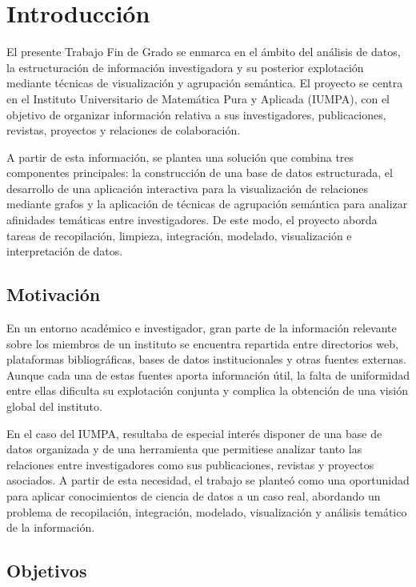 \documentclass[11pt,spanish,listoffigures,listoftables]{tfgetsinf}
\begin{document}

\chapter{Introducción} 

El presente Trabajo Fin de Grado se enmarca en el ámbito del análisis de datos, la estructuración de información investigadora y su posterior explotación mediante técnicas de visualización y agrupación semántica. El proyecto se centra en el Instituto Universitario de Matemática Pura y Aplicada (IUMPA), con el objetivo de organizar información relativa a sus investigadores, publicaciones, revistas, proyectos y relaciones de colaboración.

A partir de esta información, se plantea una solución que combina tres componentes principales: la construcción de una base de datos estructurada, el desarrollo de una aplicación interactiva para la visualización de relaciones mediante grafos y la aplicación de técnicas de agrupación semántica para analizar afinidades temáticas entre investigadores. De este modo, el proyecto aborda tareas de recopilación, limpieza, integración, modelado, visualización e interpretación de datos.

\section{Motivación}

En un entorno académico e investigador, gran parte de la información relevante sobre los miembros de un instituto se encuentra repartida entre directorios web, plataformas bibliográficas, bases de datos institucionales y otras fuentes externas. Aunque cada una de estas fuentes aporta información útil, la falta de uniformidad entre ellas dificulta su explotación conjunta y complica la obtención de una visión global del instituto.

En el caso del IUMPA, resultaba de especial interés disponer de una base de datos organizada y de una herramienta que permitiese analizar tanto las relaciones entre investigadores como sus publicaciones, revistas y proyectos asociados. A partir de esta necesidad, el trabajo se planteó como una oportunidad para aplicar conocimientos de ciencia de datos a un caso real, abordando un problema de recopilación, integración, modelado, visualización y análisis temático de la información.

\section{Objetivos}
\end{document}
